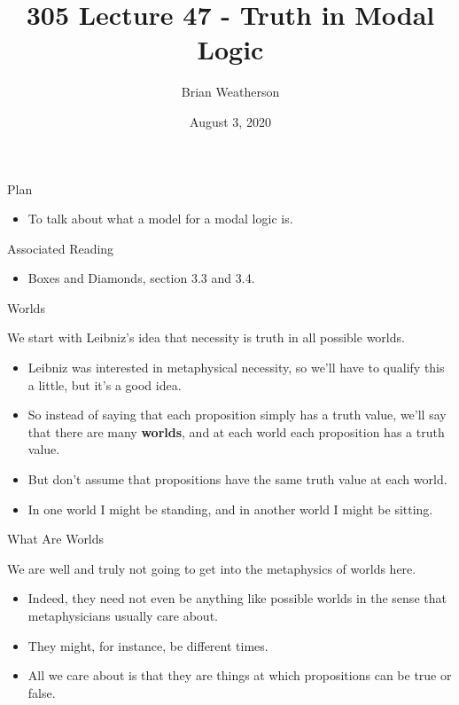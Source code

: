 \documentclass[
  ignorenonframetext,
]{beamer}
\title{305 Lecture 47 - Truth in Modal Logic}
\author{Brian Weatherson}
\date{August 3, 2020}
\providecommand{\tightlist}{%
  \setlength{\itemsep}{0pt}\setlength{\parskip}{0pt}}
\renewcommand{\,}{\text{, }}
\begin{document}
\frame{\titlepage}

\begin{frame}{Plan}
\protect\hypertarget{plan}{}

\begin{itemize}
\tightlist
\item
  To talk about what a model for a modal logic is.
\end{itemize}

\end{frame}

\begin{frame}{Associated Reading}
\protect\hypertarget{associated-reading}{}

\begin{itemize}
\tightlist
\item
  Boxes and Diamonds, section 3.3 and 3.4.
\end{itemize}

\end{frame}

\begin{frame}{Worlds}
\protect\hypertarget{worlds}{}

We start with Leibniz's idea that necessity is truth in all possible
worlds.

\begin{itemize}
\tightlist
\item
  Leibniz was interested in metaphysical necessity, so we'll have to
  qualify this a little, but it's a good idea.
\item
  So instead of saying that each proposition simply has a truth value,
  we'll say that there are many \textbf{worlds}, and at each world each
  proposition has a truth value.
\item
  But don't assume that propositions have the same truth value at each
  world.
\item
  In one world I might be standing, and in another world I might be
  sitting.
\end{itemize}

\end{frame}

\begin{frame}{What Are Worlds}
\protect\hypertarget{what-are-worlds}{}

We are well and truly not going to get into the metaphysics of worlds
here.

\begin{itemize}
\tightlist
\item
  Indeed, they need not even be anything like possible worlds in the
  sense that metaphysicians usually care about.
\item
  They might, for instance, be different times.
\item
  All we care about is that they are things at which propositions can be
  true or false.
\end{itemize}

\end{frame}
\end{document}
